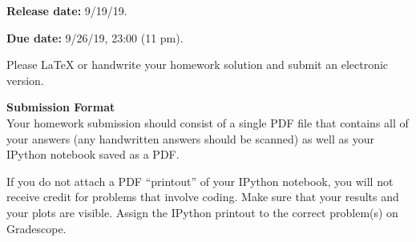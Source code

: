 

\def\title{Homework 3}

\newcommand{\qitem}{\qpart\item}

\renewcommand{\labelenumi}{(\alph{enumi})} %
\renewcommand{\theenumi}{(\alph{enumi})} %
\renewcommand{\labelenumii}{\roman{enumii}.} %
\renewcommand{\theenumii}{\roman{enumii}.}

\maketitle






\noindent
{\bf Release date:} 9/19/19.

{\bf Due date:} 9/26/19, 23:00 (11 pm). 

Please \LaTeX{} or handwrite your homework solution and submit an electronic version.

\textbf{Submission Format} \\
Your homework submission should consist of a single PDF file that contains all of your answers (any handwritten answers should be scanned) as well as your IPython notebook saved as a PDF.
			
If you do not attach a PDF ``printout'' of your IPython notebook, you will not receive credit for problems that involve coding. Make sure that your results and your plots are visible. Assign the IPython printout to the correct problem(s) on Gradescope.

\begin{qunlist}

\newpage

\newpage

\newpage

\newpage


\end{qunlist}

